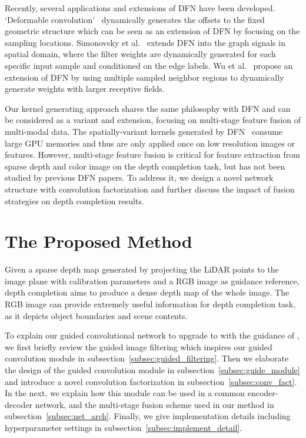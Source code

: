 \documentclass[journal]{IEEEtran}
\begin{document}
Recently, several applications and extensions of DFN have been developed.
`Deformable convolution'~\cite{deformable_conv} dynamically generates the offsets to the fixed geometric structure
which can be seen as an extension of DFN by focusing on the sampling locations.
Simonovsky et al.~\cite{edge_condition_filter} extends DFN into the graph signals in spatial domain,
where the filter weights are dynamically generated for each specific input sample and conditioned on the edge labels.
Wu et al.~\cite{large_dynamic_filter} propose an extension of DFN by using multiple sampled neighbor regions to dynamically generate weights with larger receptive fields.


Our kernel generating approach shares the same philosophy with DFN and can be considered as a variant and extension, focusing on multi-stage feature fusion of multi-modal data.    
The spatially-variant kernels generated by DFN~\cite{dynamic_filter} consume large GPU memories and thus are only applied once on low resolution images or features. 
However, multi-stage feature fusion is critical for feature extraction from sparse depth and color image on the depth completion task, but has not been studied by previous DFN papers.  
To address it, we design a novel network structure with convolution factorization and further discuss the impact of fusion strategies on depth completion results.
 

\section{The Proposed Method}
Given a sparse depth map  generated by projecting the LiDAR points to the image plane with calibration parameters and
a RGB image  as guidance reference,
depth completion aims to produce a dense depth map  of the whole image.
The RGB image can provide extremely useful information for depth completion task, as it depicts object boundaries and scene contents. 

To explain our guided convolutional network to upgrade  to  with the guidance of ,
we first briefly review the guided image filtering which inspires our guided convolution module in subsection~\ref{subsec:guided_filtering}.
Then we elaborate the design of the guided convolution module in subsection~\ref{subsec:guide_module} and introduce a novel convolution factorization in subsection~\ref{subsec:conv_fact}.
In the next, we explain how this module can be used in a common encoder-decoder network, and the multi-stage fusion scheme used in our method in subsection~\ref{subsec:net_arch}.
Finally, we give implementation details including hyperparameter settings in subsection~\ref{subsec:implement_detail}.
\end{document}

